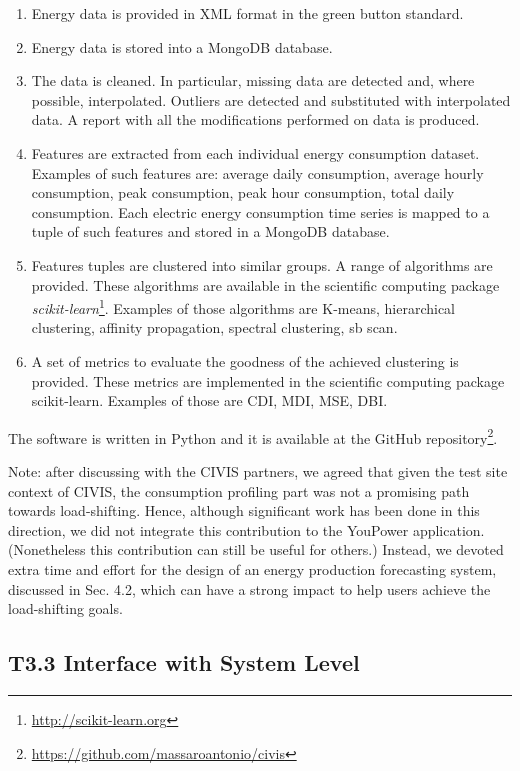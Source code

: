 \begin{enumerate} 
\item Energy data is provided in XML format in the green button standard.
\item Energy data is stored into a MongoDB database.
\item The data is cleaned. In particular, missing data are detected and, where possible, interpolated. Outliers are detected and substituted with interpolated data. A report with all the modifications performed on
data is produced. 
\item Features are extracted from each individual energy consumption dataset. Examples of such
features are: average daily consumption, average hourly consumption, peak consumption, peak hour
consumption, total daily consumption. Each electric energy consumption time series is mapped to a
tuple of such features and stored in a MongoDB database.
\item Features tuples are clustered into similar groups. A range of algorithms are provided. These
algorithms are available in the scientific computing package \textit{scikit-learn}\footnote{\url{http://scikit-learn.org}}. Examples of those algorithms are K-means,
hierarchical clustering, affinity propagation, spectral clustering, sb scan.
\item A set of metrics to evaluate the goodness of the achieved clustering is provided. These metrics are implemented in the scientific computing package scikit-learn. Examples of those are CDI, MDI,
MSE, DBI.
\end{enumerate}

The software is written in Python and it is available at the GitHub repository\footnote{\url{https://github.com/massaroantonio/civis}}.

Note: after discussing with the CIVIS partners, we agreed that given the test site context of CIVIS, the consumption profiling part was not a promising path towards load-shifting. Hence, although significant work has been done in this direction, we did not integrate this contribution to the YouPower application. (Nonetheless this contribution can still be useful for others.)
Instead, we devoted extra time and effort for the design of an energy production forecasting
system, discussed in Sec. 4.2, which can have a strong impact to help users achieve the load-shifting goals.

\subsection{T3.3 Interface with System Level}

